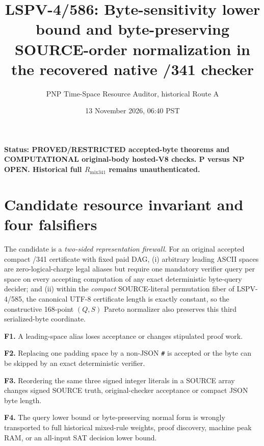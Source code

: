 \documentclass[11pt]{article}
\title{LSPV-4/586: Byte-sensitivity lower bound and byte-preserving SOURCE-order normalization in the recovered native /341 checker}
\author{PNP Time-Space Resource Auditor, historical Route A}
\date{13 November 2026, 06:40 PST}
\begin{document}
\maketitle
\noindent\textbf{Status: PROVED/RESTRICTED accepted-byte theorems and COMPUTATIONAL original-body hosted-V8 checks. P versus NP OPEN. Historical full $R_{\mathrm{mix341}}$ remains unauthenticated.}
\section*{Candidate resource invariant and four falsifiers}
The candidate is a \emph{two-sided representation firewall}. For an original accepted compact /341 certificate with fixed paid DAG, (i) arbitrary leading ASCII spaces are zero-logical-charge legal aliases but require one mandatory verifier query per space on every accepting computation of any exact deterministic byte-query decider; and (ii) within the \emph{compact} SOURCE-literal permutation fiber of LSPV-4/585, the canonical UTF-8 certificate length is exactly constant, so the constructive 168-point $(Q,S)$ Pareto normalizer also preserves this third serialized-byte coordinate.
\par\noindent\textbf{F1.} A leading-space alias loses acceptance or changes stipulated proof work.
\par\noindent\textbf{F2.} Replacing one padding space by a non-JSON \texttt{\#} is accepted or the byte can be skipped by an exact deterministic verifier.
\par\noindent\textbf{F3.} Reordering the same three signed integer literals in a SOURCE array changes signed SOURCE truth, original-checker acceptance or compact JSON byte length.
\par\noindent\textbf{F4.} The query lower bound or byte-preserving normal form is wrongly transported to full historical mixed-rule weights, proof discovery, machine peak RAM, or an all-input SAT decision lower bound.
\end{document}
